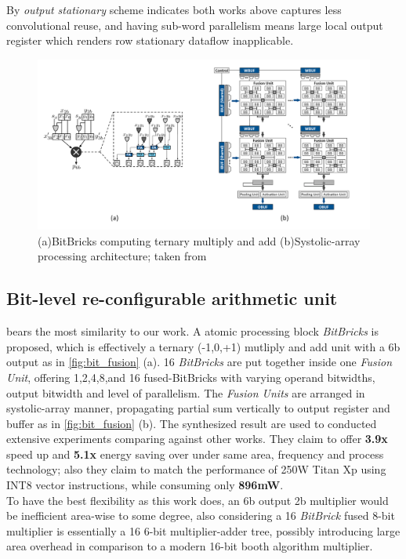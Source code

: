 By \textit{output stationary} scheme indicates both works above captures less convolutional reuse, and having sub-word parallelism means large local output register which renders row stationary dataflow inapplicable.
\begin{figure}[t]
    \centering
    \includegraphics[width=0.7\linewidth]{inc/2_related_work/figure/bit_fusion.png}
    \caption{(a)BitBricks computing ternary multiply and add (b)Systolic-array processing architecture; taken from \cite{BitFusion}}
    \label{fig:bit_fusion}
\end{figure}
\subsection{Bit-level re-configurable arithmetic unit}

\cite{BitFusion} bears the most similarity to our work. A atomic processing block \textit{BitBricks} is proposed, which is effectively a ternary (-1,0,+1) mutliply and add unit with a 6b output as in \autoref{fig:bit_fusion} (a). 16 \textit{BitBricks} are put together inside one \textit{Fusion Unit}, offering 1,2,4,8,and 16 fused-BitBricks with varying operand bitwidths, output bitwidth and level of parallelism. The \textit{Fusion Units} are arranged in systolic-array manner, propagating partial sum vertically to output register and buffer as in \autoref{fig:bit_fusion} (b). The synthesized result are used to conducted extensive experiments comparing against other works. They claim to offer \textbf{3.9x} speed up and \textbf{5.1x} energy saving over \cite{Eyeriss} under same area, frequency and process technology; also they claim to match the performance of 250W Titan Xp using INT8 vector instructions, while consuming only \textbf{896mW}. \\
To have the best flexibility as this work does, an 6b output 2b multiplier would be inefficient area-wise to some degree, also considering a 16 \textit{BitBrick} fused 8-bit multiplier is essentially a 16 6-bit multiplier-adder tree, possibly introducing large area overhead in comparison to a modern 16-bit booth algorithm multiplier.
 \\

